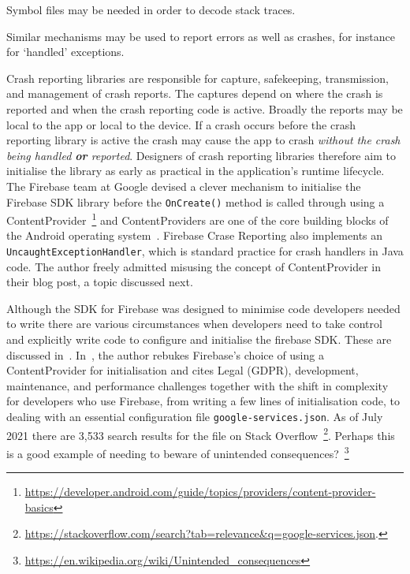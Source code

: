 Symbol files may be needed in order to decode stack traces. 

Similar mechanisms may be used to report errors as well as crashes, for instance for `handled' exceptions.

Crash reporting libraries are responsible for capture, safekeeping, transmission, and management of crash reports. The captures depend on where the crash is reported and when the crash reporting code is active. Broadly the reports may be local to the app or local to the device. If a crash occurs before the crash reporting library is active the crash may cause the app to crash \emph{without the crash being handled \textbf{or} reported}. Designers of crash reporting libraries therefore aim to initialise the library as early as practical in the application's runtime lifecycle. The Firebase team at Google devised a clever mechanism to initialise the Firebase SDK library before the \texttt{OnCreate()} method is called through using a ContentProvider~\footnote{\url{https://developer.android.com/guide/topics/providers/content-provider-basics}} and ContentProviders are one of the core building blocks of the Android operating system~\citep{firebaseblog2016_how_does_firebase_initialize_on_android}. Firebase Crase Reporting also implements an \texttt{UncaughtExceptionHandler}, which is standard practice for crash handlers in Java code. The author freely admitted misusing the concept of ContentProvider in their blog post, a topic discussed next.

Although the SDK for Firebase was designed to minimise code developers needed to write there are various circumstances when developers need to take control and explicitly write code to configure and initialise the firebase SDK. These are discussed in~\citep{firebaseblog2017_take_control_of_your_firebase_init_on_android}. In~\citep{techyourchance2021_contentprovider_in_android_libraries_considered_harmful}, the author rebukes Firebase's choice of using a ContentProvider for initialisation and cites Legal (GDPR), development, maintenance, and performance challenges together with the shift in complexity for developers who use Firebase, from writing a few lines of initialisation code, to dealing with an essential configuration file \texttt{google-services.json}. As of  July 2021 there are 3,533 search results for the file on Stack Overflow~\footnote{\url{https://stackoverflow.com/search?tab=relevance&q=google-services.json}.}. Perhaps this is a good example of needing to beware of unintended consequences?~\footnote{\url{https://en.wikipedia.org/wiki/Unintended_consequences}}


